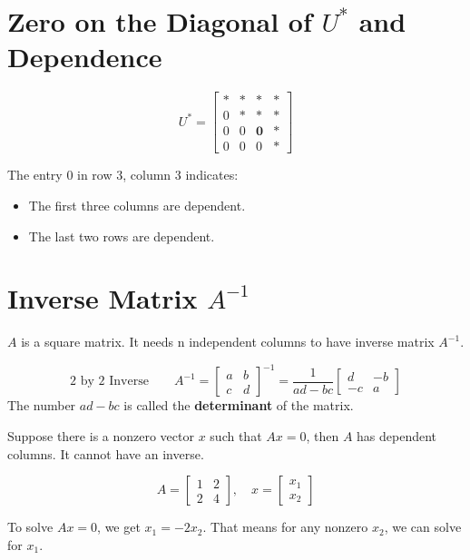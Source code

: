 \section{Zero on the Diagonal of $U^*$ and Dependence}

\[
    U^* =
    \begin{bmatrix}
        * & * & *          & * \\
        0 & * & *          & * \\
        0 & 0 & \textbf{0} & * \\
        0 & 0 & 0          & *
    \end{bmatrix}
\]

\noindent The entry \(0\) in row 3, column 3 indicates:

\begin{itemize}
    \item The first three columns are dependent.
    \item The last two rows are dependent.
\end{itemize}

\section{Inverse Matrix $A^{-1}$}

$A$ is a square matrix. It needs n independent columns to have inverse matrix $A^{-1}$.

\begin{mdframed}
    \[
        \text{2 by 2 Inverse} \qquad
        A^{-1} = \begin{bmatrix}
            a & b \\ c & d
        \end{bmatrix}^{-1}
        = \frac{1}{ad-bc}\begin{bmatrix}
            d & -b \\ -c & a
        \end{bmatrix}
    \]
    The number $ad-bc$ is called the \textbf{determinant} of the matrix.
\end{mdframed}

\noindent Suppose there is a nonzero vector $x$ such that $Ax=0$, then $A$ has dependent columns. It cannot have an inverse.

\begin{examplex}
    \[
        A = \begin{bmatrix}
            1 & 2 \\ 2 & 4
        \end{bmatrix}, \quad
        x = \begin{bmatrix}
            x_1 \\ x_2
        \end{bmatrix}
    \]

    To solve $Ax=0$, we get $x_1 = -2x_2$. That means for any nonzero $x_2$, we can solve for $x_1$.
\end{examplex}

